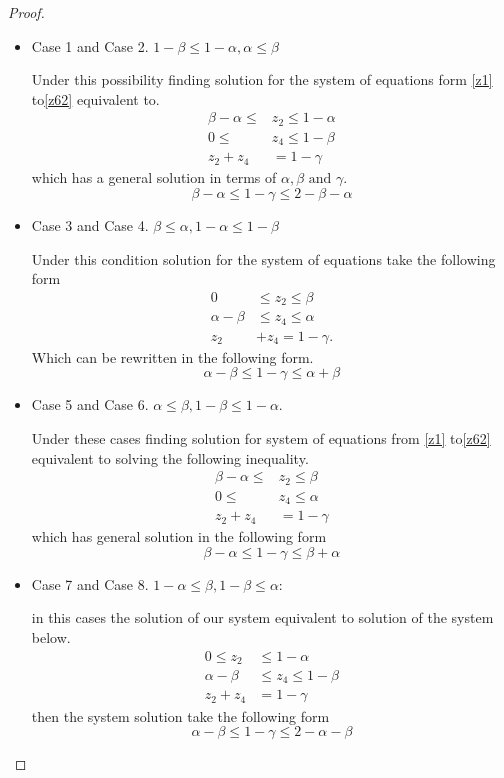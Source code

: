 \begin{proof}
\begin{itemize}
\item Case 1 and Case 2. $1-\beta \leq 1-\alpha , \alpha \leq \beta$

Under this possibility finding solution for the system of equations form  \ref{z1} to\ref{z62} equivalent to.
\begin{align*}
\beta -\alpha\leq &z_2 \leq 1-\alpha\\
0 \leq &z_4 \leq 1-\beta\\
z_2+z_4&=1-\gamma
\end{align*}
which has a general solution in terms of $\alpha,\beta \text{ and } \gamma$.
\begin{equation}\label{zc1}
 \beta -\alpha\leq1-\gamma \leq 2-\beta-\alpha
\end{equation}


\item Case 3 and Case 4. $\beta \leq \alpha , 1-\alpha \leq 1-\beta$

Under this condition solution for the system of equations take the following form
\begin{align*}
0&\leq z_2\leq \beta\\
\alpha-\beta&\leq z_4\leq \alpha\\
z_2&+z_4=1-\gamma.
\end{align*}
Which can be rewritten in the following form.
\begin{equation}\label{zc3}
\alpha-\beta \leq 1-\gamma \leq \alpha+\beta
\end{equation}

\item Case 5 and Case 6. $\alpha\leq \beta , 1-\beta \leq 1-\alpha$.

Under these cases finding solution for system of equations from \ref{z1} to\ref{z62} equivalent to solving the following inequality.
\begin{align*}
\beta-\alpha \leq &z_2 \leq \beta\\
0 \leq &z_4 \leq \alpha\\
z_2+z_4&=1-\gamma
\end{align*}
which has  general solution in the following form
\begin{equation}\label{zc5}
\beta-\alpha \leq1-\gamma \leq \beta+\alpha
\end{equation}
\item Case 7 and Case 8. $1-\alpha\leq  \beta , 1-\beta \leq \alpha$:

in this cases the solution of our system equivalent to solution of the system below.
\begin{align*}
0\leq z_2&\leq 1-\alpha\\
\alpha-\beta &\leq z_4\leq 1-\beta\\
z_2+z_4&=1-\gamma
\end{align*}
then the system solution take the following form
\begin{equation}\label{zc7}
\alpha-\beta \leq 1-\gamma \leq 2-\alpha-\beta
\end{equation}
\end{itemize}


\end{proof}
